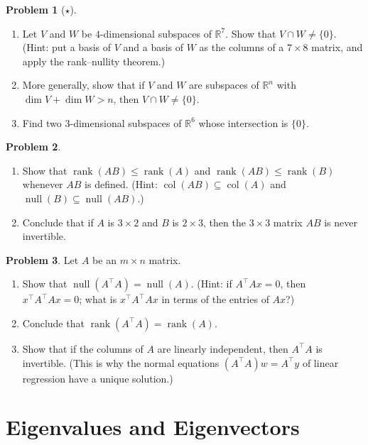 \documentclass[11pt]{article}
\theoremstyle{definition}
\newtheorem{problem}{Problem}[section]
\DeclareMathOperator{\rank}{rank}
\DeclareMathOperator{\Null}{null}
\DeclareMathOperator{\col}{col}
\begin{document}
\begin{problem}[$\star$]\label{pr:intersect}
    \begin{enumerate}[label=(\alph*)]
        \item Let $V$ and $W$ be $4$-dimensional subspaces of $\mathbb{R}^7$. Show that $V \cap W \neq \{0\}$. (Hint: put a basis of $V$ and a basis of $W$ as the columns of a $7 \times 8$ matrix, and apply the rank--nullity theorem.)
        \item More generally, show that if $V$ and $W$ are subspaces of $\mathbb{R}^n$ with $\dim V + \dim W > n$, then $V \cap W \neq \{0\}$.
        \item Find two $3$-dimensional subspaces of $\mathbb{R}^6$ whose intersection is $\{0\}$.
    \end{enumerate}
\end{problem}

\begin{problem}\label{pr:rankAB}
    \begin{enumerate}[label=(\alph*)]
        \item Show that $\rank(AB) \leq \rank(A)$ and $\rank(AB) \leq \rank(B)$ whenever $AB$ is defined. (Hint: $\col(AB) \subseteq \col(A)$ and $\Null(B) \subseteq \Null(AB)$.)
        \item Conclude that if $A$ is $3 \times 2$ and $B$ is $2 \times 3$, then the $3 \times 3$ matrix $AB$ is never invertible.
    \end{enumerate}
\end{problem}

\begin{problem}\label{pr:ATA}
    Let $A$ be an $m \times n$ matrix.
    \begin{enumerate}[label=(\alph*)]
        \item Show that $\Null(A^\top A) = \Null(A)$. (Hint: if $A^\top A x = 0$, then $x^\top A^\top A x = 0$; what is $x^\top A^\top A x$ in terms of the entries of $Ax$?)
        \item Conclude that $\rank(A^\top A) = \rank(A)$.
        \item Show that if the columns of $A$ are linearly independent, then $A^\top A$ is invertible. (This is why the normal equations $(A^\top A)w = A^\top y$ of linear regression have a unique solution.)
    \end{enumerate}
\end{problem}

\section{Eigenvalues and Eigenvectors}
\end{document}
